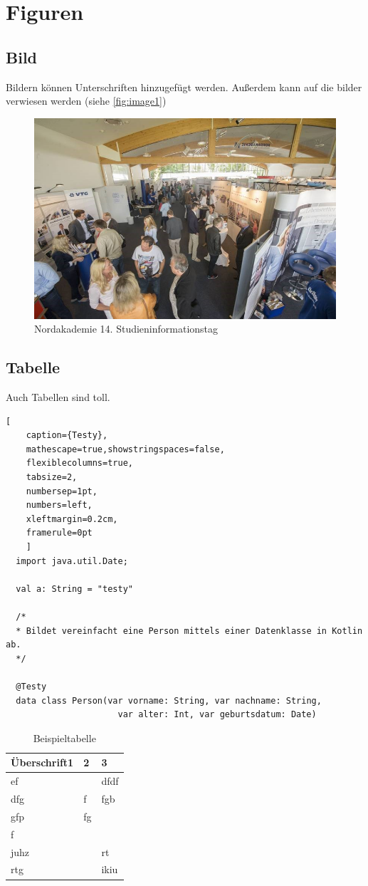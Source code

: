 \chapter{Figuren}
\section{Bild}
Bildern können Unterschriften hinzugefügt werden. Außerdem kann auf die bilder verwiesen werden (siehe \autoref{fig:image1})
\begin{figure}[htbp]
	\centering
	\includegraphics[width=0.9\linewidth]{image/image1}
	\caption[Nordakademie 14. Studieninformationstag]{Nordakademie 14. Studieninformationstag}
	\label{fig:image1}
\end{figure}
\section{Tabelle}
Auch Tabellen sind toll.
\begin{lstlisting}[
    caption={Testy},
    mathescape=true,showstringspaces=false,
    flexiblecolumns=true,
    tabsize=2,
    numbersep=1pt,
    numbers=left,
    xleftmargin=0.2cm,
    framerule=0pt
    ]
  import java.util.Date;
    
  val a: String = "testy"
    
  /*
  * Bildet vereinfacht eine Person mittels einer Datenklasse in Kotlin ab.
  */

  @Testy 
  data class Person(var vorname: String, var nachname: String, 
                      var alter: Int, var geburtsdatum: Date)    
\end{lstlisting}

\begin{table}[htbp]
	\centering
    \begin{tabular}{|l|l|l|}
    \hline
    Überschrift1 & 2 & 3 \\ \hline
    ef &  & dfdf \\ \hline
    dfg & f & fgb \\ \hline
    gfp & fg &  \\ \hline
    f &  &  \\ \hline
    juhz &  & rt \\ \hline
    rtg &  & ikiu \\ \hline
    \end{tabular}
    \caption{Beispieltabelle} 
    \label{table:Tabelle}
\end{table}

